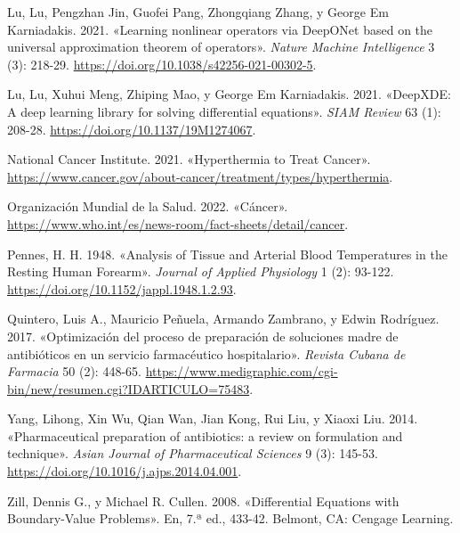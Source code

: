 \documentclass[
  spanish,
  us-letterpaper,
]{scrreprt}
\newlength{\cslhangindent}
\newenvironment{CSLReferences}[2] %
 {\begin{list}{}{%
  \setlength{\itemindent}{0pt}
  \setlength{\leftmargin}{0pt}
  \setlength{\parsep}{0pt}
  \ifodd #1
   \setlength{\leftmargin}{\cslhangindent}
   \setlength{\itemindent}{-1\cslhangindent}
  \fi
  \setlength{\itemsep}{#2\baselineskip}}}
 {\end{list}}
\theoremstyle{definition}
\theoremstyle{plain}
\theoremstyle{remark}
\begin{document}
\begin{CSLReferences}{1}{0}
Lu, Lu, Pengzhan Jin, Guofei Pang, Zhongqiang Zhang, y George Em
Karniadakis. 2021. {«Learning nonlinear operators via DeepONet based on
the universal approximation theorem of operators»}. \emph{Nature Machine
Intelligence} 3 (3): 218-29.
\url{https://doi.org/10.1038/s42256-021-00302-5}.

Lu, Lu, Xuhui Meng, Zhiping Mao, y George Em Karniadakis. 2021.
{«{DeepXDE}: A deep learning library for solving differential
equations»}. \emph{SIAM Review} 63 (1): 208-28.
\url{https://doi.org/10.1137/19M1274067}.

National Cancer Institute. 2021. {«{Hyperthermia to Treat Cancer}»}.
\url{https://www.cancer.gov/about-cancer/treatment/types/hyperthermia}.

Organización Mundial de la Salud. 2022. {«{Cáncer}»}.
\url{https://www.who.int/es/news-room/fact-sheets/detail/cancer}.

Pennes, H. H. 1948. {«Analysis of Tissue and Arterial Blood Temperatures
in the Resting Human Forearm»}. \emph{Journal of Applied Physiology} 1
(2): 93-122. \url{https://doi.org/10.1152/jappl.1948.1.2.93}.

Quintero, Luis A., Mauricio Peñuela, Armando Zambrano, y Edwin
Rodríguez. 2017. {«Optimización del proceso de preparación de soluciones
madre de antibióticos en un servicio farmacéutico hospitalario»}.
\emph{Revista Cubana de Farmacia} 50 (2): 448-65.
\url{https://www.medigraphic.com/cgi-bin/new/resumen.cgi?IDARTICULO=75483}.

Yang, Lihong, Xin Wu, Qian Wan, Jian Kong, Rui Liu, y Xiaoxi Liu. 2014.
{«Pharmaceutical preparation of antibiotics: a review on formulation and
technique»}. \emph{Asian Journal of Pharmaceutical Sciences} 9 (3):
145-53. \url{https://doi.org/10.1016/j.ajps.2014.04.001}.

Zill, Dennis G., y Michael R. Cullen. 2008. {«Differential Equations
with Boundary-Value Problems»}. En, 7.ª ed., 433-42. Belmont, CA:
Cengage Learning.

\end{CSLReferences}
\end{document}
